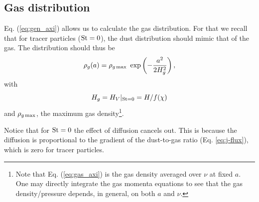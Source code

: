 \documentclass[apj]{emulateapj}
\def\blue#1{\textcolor{blue}{ #1}}
\newcommand{\Eq}[1]{Eq. (\ref{#1})}
\newcommand{\eq}[1]{\Eq{#1}}
\newcommand{\eqp}[1]{(Eq. \ref{#1})}
\newcommand{\beq}{\begin{equation}}
\newcommand{\eeq}{\end{equation}}
\newcommand{\St}{{\rm St}}
\begin{document}

\subsection{Gas distribution}

\eq{eq:gen_axi} allows us to calculate the gas distribution. For
  that we recall that  for tracer particles ($\St=0$), the dust distribution should
  mimic that of the gas. The distribution should thus be 
\beq
\rho_g(a) = \rho_{g\,{\rm max}} \ \exp\left(-\frac{a^2}{2H_g^2}\right), \label{eq:gas_axi}
\eeq
\noindent with 
\beq
H_g = {H_V}{\vert_{\St=0}} = H/f(\chi) \label{eq:hg}
\eeq \noindent and
$\rho_{g\,{\rm max}}$, the maximum gas density{\footnote{Note that 
\eq{eq:gas_axi} is the gas density averaged over $\nu$ at fixed $a$.  One may  
directly integrate the gas momenta equations to see that the gas
density/pressure depends, in general, on both $a$ and $\nu$.}}.

Notice that for $\St=0$ the effect of diffusion cancels out. This is because
the diffusion is proportional to the gradient of the dust-to-gas
ratio \eqp{eq:j-flux}, which is zero for tracer
particles.
\end{document}
